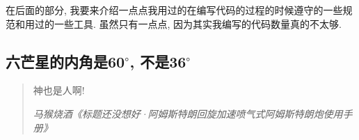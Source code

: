 在后面的部分, 我要来介绍一点点我用过的在编写代码的过程的时候遵守的一些规范和用过的一些工具. 虽然只有一点点, 因为其实我编写的代码数量真的不太够. 

\subsection{六芒星的内角是60$^\circ$, 不是36$^\circ$}
\begin{quotation}
  神也是人啊! 

  \emph{马猴烧酒《标题还没想好·阿姆斯特朗回旋加速喷气式阿姆斯特朗炮使用手册》}
\end{quotation}

